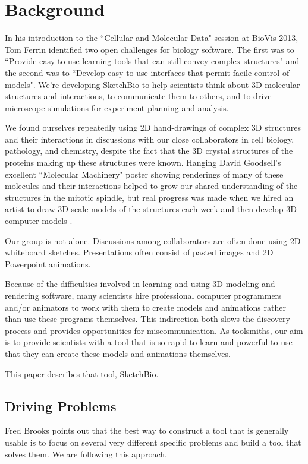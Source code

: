 \documentclass[twocolumn]{bmcart}%
\begin{document}


\section*{Background}

In his introduction to the ``Cellular and Molecular Data" session at BioVis 2013, Tom Ferrin identified two open challenges for biology software.  The first was to ``Provide easy-to-use learning tools that can still convey complex structures" and the second was to ``Develop easy-to-use interfaces that permit facile control of models".  We’re developing SketchBio to help scientists think about 3D molecular structures and interactions, to communicate them to others, and to drive microscope simulations for experiment planning and analysis.

We found ourselves repeatedly using 2D hand-drawings of complex 3D structures and their interactions in discussions with our close collaborators in cell biology, pathology, and chemistry, despite the fact that the 3D crystal structures of the proteins making up these structures were known.  Hanging David Goodsell's excellent ``Molecular Machinery" poster \cite{Goodsell} showing renderings of many of these molecules and their interactions helped to grow our shared understanding of the structures in the mitotic spindle, but real progress was made when we hired an artist to draw 3D scale models of the structures each week and then develop 3D computer models \cite{taylor2012}.

Our group is not alone.  Discussions among collaborators are often done using 2D whiteboard sketches.  Presentations often consist of pasted images and 2D Powerpoint animations.

Because of the difficulties involved in learning and using 3D modeling and rendering software, many scientists hire professional computer programmers and/or animators to work with them to create models and animations rather than use these programs themselves.  This indirection both slows the discovery process and provides opportunities for miscommunication. As toolsmiths, our aim is to provide scientists with a tool that is so rapid to learn and powerful to use that they can create these models and animations themselves.

This paper describes that tool, SketchBio.

\subsection*{Driving Problems}
Fred Brooks points out that the best way to construct a tool that is generally usable is to focus on several very different specific problems and build a tool that solves them.  We are following this approach.
\end{document}
